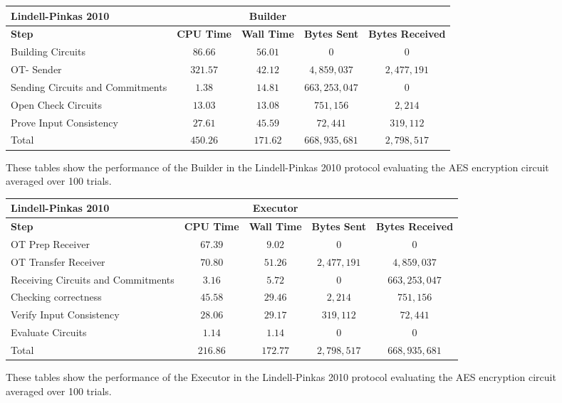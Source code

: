 \documentclass[ %
                    author={Nicholas Tutte},
                supervisor={Prof. Nigel Smart},
                    degree={MEng},
                     title={Secure Two Party Computation},
                  subtitle={A practical comparison of recent protocols},
                      type={Research - GG1K},
                      year={2015} ]{dissertation}
\begin{document}
				\begin{figure}[!ht]
					\begin{tabular}{| p{3.5cm} | c c c c |}
						\hline
						\textbf{Lindell-Pinkas 2010} & & \textbf{Builder} & & \\
						\hline
						\textbf{Step} & \textbf{CPU Time} & \textbf{Wall Time} & \textbf{Bytes Sent} & \textbf{Bytes Received} \\
						\thickhline
						Building Circuits & $86.66$ & $56.01$ & $0$ & $0$ \\
						\hline
						OT- Sender & $321.57$ & $42.12$ & $4,859,037$ & $2,477,191$ \\
						\hline
						Sending Circuits and Commitments & $1.38$ & $14.81$ & $663,253,047$ & $0$ \\
						\hline
						Open Check Circuits & $13.03$ & $13.08$ & $751,156$ & $2,214$ \\
						\hline
						Prove Input Consistency & $27.61$ & $45.59$ & $72,441$ & $319,112$ \\
						\thickhline
						Total & $450.26$ & $171.62$ & $668,935,681$ & $2,798,517$ \\
						\hline
					\end{tabular}
					\caption{These tables show the performance of the Builder in the Lindell-Pinkas 2010 protocol evaluating the AES encryption circuit averaged over 100 trials. \label{table:LP_2010_AES_Builder}}
				\end{figure}

				\begin{figure}
					\begin{tabular}{| p{3.5cm} | c c c c |}
						\hline
						\textbf{Lindell-Pinkas 2010} & & \textbf{Executor} & & \\
						\hline
						\textbf{Step} & \textbf{CPU Time} & \textbf{Wall Time} & \textbf{Bytes Sent} & \textbf{Bytes Received} \\
						\thickhline
						OT Prep Receiver & $67.39$ & $9.02$ & $0$ & $0$ \\
						\hline
						OT Transfer Receiver & $70.80$ & $51.26$ & $2,477,191$ & $4,859,037$ \\
						\hline
						Receiving Circuits and Commitments & $3.16$ & $5.72$ & $0$ & $663,253,047$ \\
						\hline
						Checking correctness & $45.58$ & $29.46$ & $2,214$ & $751,156$ \\
						\hline
						Verify Input Consistency & $28.06$ & $29.17$ & $319,112$ & $72,441$ \\
						\hline
						Evaluate Circuits & $1.14$ & $1.14$ & $0$ & $0$ \\
						\thickhline
						Total & $216.86$ & $172.77$ & $2,798,517$ & $668,935,681$ \\
						\hline
					\end{tabular}
					\caption{These tables show the performance of the Executor in the Lindell-Pinkas 2010 protocol evaluating the AES encryption circuit averaged over 100 trials. \label{table:LP_2010_AES_Executor}}
				\end{figure}
\end{document}
